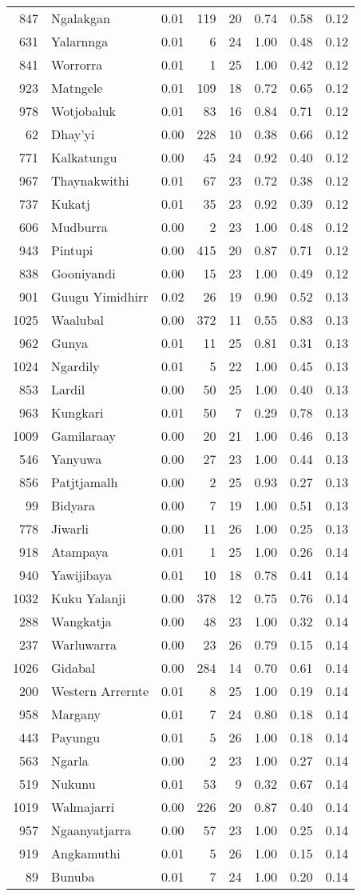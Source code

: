 \begin{longtable}[]{@{}rlrrrrrr@{}}
847 & Ngalakgan & 0.01 & 119 & 20 & 0.74 & 0.58 & 0.12\tabularnewline
631 & Yalarnnga & 0.01 & 6 & 24 & 1.00 & 0.48 & 0.12\tabularnewline
841 & Worrorra & 0.01 & 1 & 25 & 1.00 & 0.42 & 0.12\tabularnewline
923 & Matngele & 0.01 & 109 & 18 & 0.72 & 0.65 & 0.12\tabularnewline
978 & Wotjobaluk & 0.01 & 83 & 16 & 0.84 & 0.71 & 0.12\tabularnewline
62 & Dhay'yi & 0.00 & 228 & 10 & 0.38 & 0.66 & 0.12\tabularnewline
771 & Kalkatungu & 0.00 & 45 & 24 & 0.92 & 0.40 & 0.12\tabularnewline
967 & Thaynakwithi & 0.01 & 67 & 23 & 0.72 & 0.38 & 0.12\tabularnewline
737 & Kukatj & 0.01 & 35 & 23 & 0.92 & 0.39 & 0.12\tabularnewline
606 & Mudburra & 0.00 & 2 & 23 & 1.00 & 0.48 & 0.12\tabularnewline
943 & Pintupi & 0.00 & 415 & 20 & 0.87 & 0.71 & 0.12\tabularnewline
838 & Gooniyandi & 0.00 & 15 & 23 & 1.00 & 0.49 & 0.12\tabularnewline
901 & Guugu Yimidhirr & 0.02 & 26 & 19 & 0.90 & 0.52 &
0.13\tabularnewline
1025 & Waalubal & 0.00 & 372 & 11 & 0.55 & 0.83 & 0.13\tabularnewline
962 & Gunya & 0.01 & 11 & 25 & 0.81 & 0.31 & 0.13\tabularnewline
1024 & Ngardily & 0.01 & 5 & 22 & 1.00 & 0.45 & 0.13\tabularnewline
853 & Lardil & 0.00 & 50 & 25 & 1.00 & 0.40 & 0.13\tabularnewline
963 & Kungkari & 0.01 & 50 & 7 & 0.29 & 0.78 & 0.13\tabularnewline
1009 & Gamilaraay & 0.00 & 20 & 21 & 1.00 & 0.46 & 0.13\tabularnewline
546 & Yanyuwa & 0.00 & 27 & 23 & 1.00 & 0.44 & 0.13\tabularnewline
856 & Patjtjamalh & 0.00 & 2 & 25 & 0.93 & 0.27 & 0.13\tabularnewline
99 & Bidyara & 0.00 & 7 & 19 & 1.00 & 0.51 & 0.13\tabularnewline
778 & Jiwarli & 0.00 & 11 & 26 & 1.00 & 0.25 & 0.13\tabularnewline
918 & Atampaya & 0.01 & 1 & 25 & 1.00 & 0.26 & 0.14\tabularnewline
940 & Yawijibaya & 0.01 & 10 & 18 & 0.78 & 0.41 & 0.14\tabularnewline
1032 & Kuku Yalanji & 0.00 & 378 & 12 & 0.75 & 0.76 &
0.14\tabularnewline
288 & Wangkatja & 0.00 & 48 & 23 & 1.00 & 0.32 & 0.14\tabularnewline
237 & Warluwarra & 0.00 & 23 & 26 & 0.79 & 0.15 & 0.14\tabularnewline
1026 & Gidabal & 0.00 & 284 & 14 & 0.70 & 0.61 & 0.14\tabularnewline
200 & Western Arrernte & 0.01 & 8 & 25 & 1.00 & 0.19 &
0.14\tabularnewline
958 & Margany & 0.01 & 7 & 24 & 0.80 & 0.18 & 0.14\tabularnewline
443 & Payungu & 0.01 & 5 & 26 & 1.00 & 0.18 & 0.14\tabularnewline
563 & Ngarla & 0.00 & 2 & 23 & 1.00 & 0.27 & 0.14\tabularnewline
519 & Nukunu & 0.01 & 53 & 9 & 0.32 & 0.67 & 0.14\tabularnewline
1019 & Walmajarri & 0.00 & 226 & 20 & 0.87 & 0.40 & 0.14\tabularnewline
957 & Ngaanyatjarra & 0.00 & 57 & 23 & 1.00 & 0.25 & 0.14\tabularnewline
919 & Angkamuthi & 0.01 & 5 & 26 & 1.00 & 0.15 & 0.14\tabularnewline
89 & Bunuba & 0.01 & 7 & 24 & 1.00 & 0.20 & 0.14\tabularnewline

\end{longtable}
